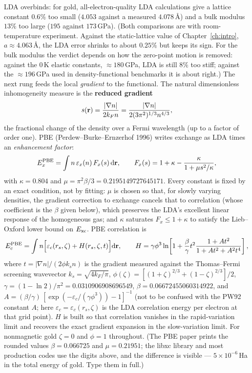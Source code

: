 LDA overbinds: for gold, all-electron-quality LDA calculations give a
lattice constant $0.6\%$ too small ($4.053$ against a measured
$4.078$\,\AA) and a bulk modulus $13\%$ too large ($195$ against
$173$\,GPa). (Both comparisons are with room-temperature experiment.
Against the static-lattice value of Chapter~\ref{ch:intro},
$a \approx 4.063$\,\AA, the LDA error shrinks to about $0.25\%$ but keeps its
sign. For the bulk modulus the verdict depends on how the zero-point motion
is removed: against the $0$\,K elastic constants, $\approx 180$\,GPa, LDA
is still $8\%$ too stiff; against the $\approx 196$\,GPa used in
density-functional benchmarks it is about right.) The next rung feeds the local
\emph{gradient} to the functional. The natural dimensionless inhomogeneity
measure is the \textbf{reduced gradient}
\begin{equation}
s(\mathbf{r}) = \frac{|\nabla n|}{2 k_F n}
= \frac{|\nabla n|}{2 (3\pi^2)^{1/3} n^{4/3}},
\end{equation}
the fractional change of the density over a Fermi wavelength (up to a
factor of order one). PBE
(Perdew--Burke--Ernzerhof 1996) writes exchange as LDA times an
\emph{enhancement factor}:
\begin{equation}
E_x^{\mathrm{PBE}} = \int n\, \varepsilon_x(n)\, F_x(s)\, \mathrm{d}\mathbf{r},
\qquad
F_x(s) = 1 + \kappa - \frac{\kappa}{1 + \mu s^2/\kappa},
\label{eq:pbex}
\end{equation}
with $\kappa = 0.804$ and $\mu = \pi^2\beta/3 = 0.2195149727645171$.
Every constant is fixed by an exact condition, not by fitting: $\mu$ is
chosen so that, for slowly varying densities, the gradient correction to
exchange cancels that to correlation (whose coefficient is the $\beta$
given below), which preserves the LDA's excellent linear response of the
homogeneous gas; and $\kappa$ saturates $F_x \le 1+\kappa$ to satisfy
the Lieb--Oxford lower bound on $E_{\mathrm{xc}}$. PBE correlation is
\begin{equation}
E_c^{\mathrm{PBE}} = \int n \Big[\varepsilon_c(r_s,\zeta)
+ H(r_s, \zeta, t)\Big] \mathrm{d}\mathbf{r},
\qquad
H = \gamma \phi^3
\ln\!\left[1 + \frac{\beta}{\gamma} t^2
\frac{1 + A t^2}{1 + A t^2 + A^2 t^4}\right],
\label{eq:pbec}
\end{equation}
where $t = |\nabla n| / (2\phi k_s n)$ is the gradient measured against the
Thomas--Fermi screening wavevector $k_s = \sqrt{4 k_F/\pi}$,
$\phi(\zeta) = [(1+\zeta)^{2/3} + (1-\zeta)^{2/3}]/2$,
$\gamma = (1 - \ln 2)/\pi^2 = 0.0310906908696549$,
$\beta = 0.06672455060314922$, and
$A = (\beta/\gamma)\,[\exp(-\varepsilon_c/(\gamma\phi^3)) - 1]^{-1}$
(not to be confused with the PW92 constant $A$; here $\varepsilon_c =
\varepsilon_c(r_s,\zeta)$ is the LDA correlation energy per electron at
that grid point). $H$ is built so that correlation vanishes in the
rapid-variation limit and recovers the exact gradient expansion in the
slow-variation limit. For nonmagnetic gold $\zeta = 0$ and $\phi = 1$
throughout. (The PBE paper prints the rounded values $\beta = 0.066725$ and
$\mu = 0.21951$; the libxc library and most production codes use the
digits above, and the difference is visible --- $5\times10^{-6}$\,Ha in the total energy of gold.
Type them in full.)

